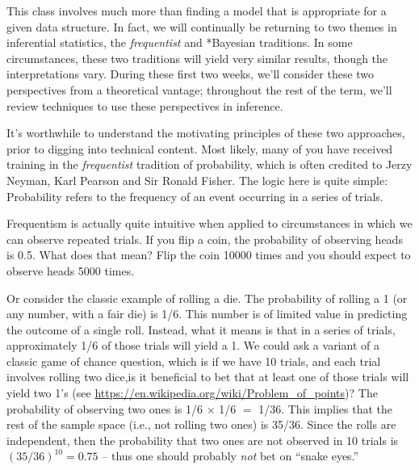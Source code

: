 \documentclass[
]{book}
\begin{document}
This class involves much more than finding a model that is appropriate for a given data structure. In fact, we will continually be returning to two themes in inferential statistics, the \emph{frequentist} and *Bayesian traditions. In some circumstances, these two traditions will yield very similar results, though the interpretations vary. During these first two weeks, we'll consider these two perspectives from a theoretical vantage; throughout the rest of the term, we'll review techniques to use these perspectives in inference.

It's worthwhile to understand the motivating principles of these two approaches, prior to digging into technical content. Most likely, many of you have received training in the \emph{frequentist} tradition of probability, which is often credited to Jerzy Neyman, Karl Pearson and Sir Ronald Fisher. The logic here is quite simple: Probability refers to the frequency of an event occurring in a series of trials.

Frequentism is actually quite intuitive when applied to circumstances in which we can observe repeated trials. If you flip a coin, the probability of observing heads is 0.5. What does that mean? Flip the coin 10000 times and you should expect to observe heads 5000 times.

Or consider the classic example of rolling a die. The probability of rolling a 1 (or any number, with a fair die) is 1/6. This number is of limited value in predicting the outcome of a single roll. Instead, what it means is that in a series of trials, approximately 1/6 of those trials will yield a 1. We could ask a variant of a classic game of chance question, which is if we have 10 trials, and each trial involves rolling two dice,is it beneficial to bet that at least one of those trials will yield two 1's (see \url{https://en.wikipedia.org/wiki/Problem_of_points})? The probability of observing two ones is 1/6 \(\times\) 1/6 \(=\) 1/36. This implies that the rest of the sample space (i.e., not rolling two ones) is 35/36. Since the rolls are independent, then the probability that two ones are not observed in 10 trials is \((35/36)^{10}=0.75\) -- thus one should probably \emph{not} bet on ``snake eyes.''
\end{document}
